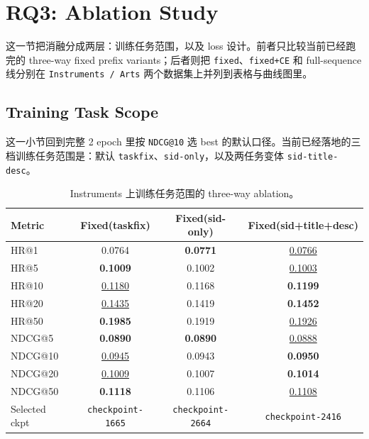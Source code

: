 \documentclass[11pt,a4paper]{ctexart}
\begin{document}
\FloatBarrier

\section{RQ3: Ablation Study}

这一节把消融分成两层：训练任务范围，以及 loss 设计。前者只比较当前已经跑完的 three-way fixed prefix variants；后者则把 \texttt{fixed}、\texttt{fixed+CE} 和 full-sequence 线分别在 \texttt{Instruments / Arts} 两个数据集上并列到表格与曲线图里。

\FloatBarrier

\subsection{Training Task Scope}

这一小节回到完整 2 epoch 里按 \texttt{NDCG@10} 选 best 的默认口径。当前已经落地的三档训练任务范围是：默认 \texttt{taskfix}、\texttt{sid-only}，以及两任务变体 \texttt{sid-title-desc}。

\begin{table}[H]
\centering
\scriptsize
\setlength{\tabcolsep}{4pt}
\renewcommand{\arraystretch}{1.08}
\begin{tabular}{lccc}
\toprule
Metric & Fixed(taskfix) & Fixed(sid-only) & Fixed(sid+title+desc) \\
\midrule
HR@1 & 0.0764 & \textbf{0.0771} & \underline{0.0766} \\
HR@5 & \textbf{0.1009} & 0.1002 & \underline{0.1003} \\
HR@10 & \underline{0.1180} & 0.1168 & \textbf{0.1199} \\
HR@20 & \underline{0.1435} & 0.1419 & \textbf{0.1452} \\
HR@50 & \textbf{0.1985} & 0.1919 & \underline{0.1926} \\
NDCG@5 & \textbf{0.0890} & \textbf{0.0890} & \underline{0.0888} \\
NDCG@10 & \underline{0.0945} & 0.0943 & \textbf{0.0950} \\
NDCG@20 & \underline{0.1009} & 0.1007 & \textbf{0.1014} \\
NDCG@50 & \textbf{0.1118} & 0.1106 & \underline{0.1108} \\
\midrule
Selected ckpt & \texttt{checkpoint-1665} & \texttt{checkpoint-2664} & \texttt{checkpoint-2416} \\
\bottomrule
\end{tabular}
\caption{Instruments 上训练任务范围的 three-way ablation。}
\label{tab:genrec-only-rq3-task-scope}
\end{table}
\end{document}
